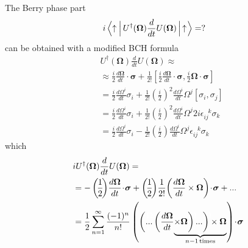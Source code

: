 \documentclass[english,aps,prd,nofootinbib,twocolumn]{revtex4-1}
\begin{document}
The Berry phase part 
\begin{equation}
\begin{split}
&i
\left\langle
\uparrow^{\textcolor{white}{\dagger}}_{\textcolor{white}{\dagger}}\!
\right|
U^{\dagger}(\boldsymbol{\Omega})
\frac{d}{dt}
U(\boldsymbol{\Omega})
\left|\,
\uparrow^{\textcolor{white}{\dagger}}_{\textcolor{white}{\dagger}}\!\!
\right\rangle = ?
\end{split}
\end{equation}
can be obtained with a modified BCH formula 
\begin{equation}
\begin{split}
&U^{\dagger}(\boldsymbol{\Omega})
\frac{d}{dt}
U(\boldsymbol{\Omega}) \approx \\&
\approx \frac{i}{2}
\frac{d\boldsymbol{\Omega}}{dt}\cdot \boldsymbol{\sigma} + 
\frac{1}{2!}
\left[ 
\frac{i}{2}\frac{d\boldsymbol{\Omega}}{dt}
\cdot \boldsymbol{\sigma} , 
\frac{i}{2}\boldsymbol{\Omega}
\cdot \boldsymbol{\sigma} \right] \\&=
\frac{i}{2}
\frac{d\Omega^{i}}{dt}\sigma_{i} + 
\frac{1}{2!}
\left( \frac{i}{2} \right)^{2}
\frac{d\Omega^{i}}{dt} \Omega^{j}
\left[ \sigma_{i}, \sigma_{j} \right] \\&=
\frac{i}{2}
\frac{d\Omega^{i}}{dt}\sigma_{i} + 
\frac{1}{2!}
\left( \frac{i}{2} \right)^{2}
\frac{d\Omega^{i}}{dt} \Omega^{j}
2i\epsilon_{ij}^{\;\;\,k}\sigma_{k} \\&=
\frac{i}{2}
\frac{d\Omega^{i}}{dt}\sigma_{i} - 
\frac{1}{2!}
\left( \frac{i}{2} \right)
\frac{d\Omega^{i}}{dt} \Omega^{j}
\epsilon_{ij}^{\;\;\,k}\sigma_{k}
\end{split}
\end{equation}
which 
\begin{equation}
\begin{split}
&i
U^{\dagger}(\boldsymbol{\Omega})
\frac{d}{dt}
U(\boldsymbol{\Omega}) = \\ &= 
-
\left(\! \frac{1}{2} \!\right)\!
\frac{d\boldsymbol{\Omega}}{dt}\!\cdot\!\boldsymbol{\sigma}
+
\left(\! \frac{1}{2} \!\right)\!
\frac{1}{2!}\!
\left(
\frac{d\boldsymbol{\Omega}}{dt}
\times 
\boldsymbol{\Omega}
\right)
\!\cdot\!
\boldsymbol{\sigma}
 + ...
\\ &= 
\frac{1}{2}	
\sum_{n=1}^{\infty} \frac{(-1)^{n}}{n!}\left(
\left(\textcolor{white}{\frac{\boldsymbol{\Omega}}{d}
\!\!\!\!\!\!\!}\right. 
\! ...
\left(\textcolor{white}{\frac{\boldsymbol{\Omega}}{d}
\!\!\!\!\!\!\!}\right.  \!
\frac{d\boldsymbol{\Omega}}{dt} \!
\underbrace{
\times \boldsymbol{\Omega}
\! 
\left.\textcolor{white}{\frac{\boldsymbol{\Omega}}{d}
\!\!\!\!\!\!\!}\right)  ... \! 
\left.\textcolor{white}{\frac{\boldsymbol{\Omega}}{d}
\!\!\!\!\!\!\!}\right) 
\times \boldsymbol{\Omega} }_{n-1\mathrm{\,times}} 
\right)
\!\cdot\!
\boldsymbol{\sigma}
\end{split}
\end{equation}
\end{document}
